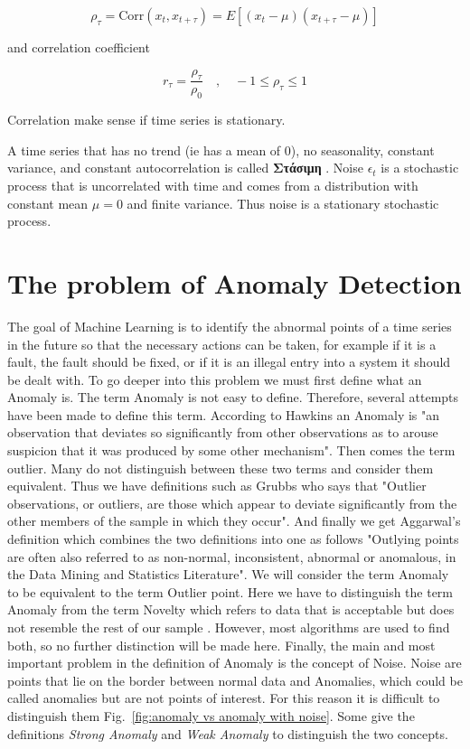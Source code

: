 \documentclass[a4paper,12pt]{report}
\theoremstyle{definitionNODot}
\begin{document}
	$$ \rho_\tau = \text{Corr}(x_t, x_{t+\tau}) = E[(x_t-\mu)(x_{t+\tau}-\mu)] $$
	
	\noindent and correlation coefficient
	
	$$ r_\tau=\frac{\rho_\tau}{\rho_0} \quad , \quad -1\leq\rho_\tau\leq1$$
	
	\noindent Correlation make sense if time series is stationary.
	
	A time series that has no trend (ie has a mean of 0), no seasonality, constant variance, and constant autocorrelation is called \textbf{Στάσιμη} \cite{hyndman2018forecasting}. Noise $\epsilon_t$ is a stochastic process that is uncorrelated with time and comes from a distribution with constant mean $\mu=0$ and finite variance. Thus noise is a stationary stochastic process.
	
	\section{The problem of Anomaly Detection}
	The goal of Machine Learning is to identify the abnormal points of a time series in the future so that the necessary actions can be taken, for example if it is a fault, the fault should be fixed, or if it is an illegal entry into a system it should be dealt with. To go deeper into this problem we must first define what an Anomaly is. The term Anomaly is not easy to define. Therefore, several attempts have been made to define this term. According to Hawkins \cite{hawkins1980identification} an Anomaly is "an observation that deviates so significantly from other observations as to arouse suspicion that it was produced by some other mechanism". Then comes the term outlier. Many do not distinguish between these two terms and consider them equivalent. Thus we have definitions such as Grubbs \cite{grubbs1969procedures} who says that "Outlier observations, or outliers, are those which appear to deviate significantly from the other members of the sample in which they occur". And finally we get Aggarwal's definition which combines the two definitions into one as follows "Outlying points are often also referred to as non-normal, inconsistent, abnormal or anomalous, in the Data Mining and Statistics Literature". We will consider the term Anomaly to be equivalent to the term Outlier point. Here we have to distinguish the term Anomaly from the term Novelty which refers to data that is acceptable but does not resemble the rest of our sample \cite{Singh2003Novelty}. However, most algorithms are used to find both, so no further distinction will be made here. Finally, the main and most important problem in the definition of Anomaly is the concept of Noise. Noise are points that lie on the border between normal data and Anomalies, which could be called anomalies but are not points of interest. For this reason it is difficult to distinguish them Fig.~\ref{fig:anomaly vs anomaly with noise}. Some give the definitions \textit{Strong Anomaly} and \textit{Weak Anomaly} \cite{knorr1999finding} to distinguish the two concepts.
	
\end{document}
